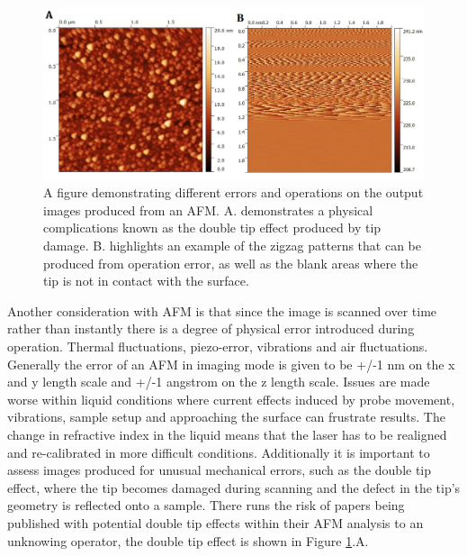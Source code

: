 \begin{figure}[h!]     %
        \begin{center}
          \includegraphics[width=140mm]{chapter2/Error.png}
\end{center}
\caption{A figure demonstrating different errors and operations on the output images produced from an AFM.  A.  demonstrates  a  physical  complications  known  as  the double tip effect produced by tip damage.  B. highlights an example of the zigzag patterns that can be produced from operation error, as well as the blank areas where the tip is not in contact with the surface.  }
\label{fig:Errorr}                 %
\end{figure}

Another consideration with AFM is that since the image is scanned over time rather than instantly there is a degree of physical error introduced during operation. Thermal fluctuations, piezo-error, vibrations and air fluctuations. Generally the error of an AFM in imaging mode is given to be +/-1 nm on the x and y length scale and +/-1 angstrom on the z length scale. Issues are made worse within liquid conditions where current effects induced by probe movement, vibrations, sample setup and approaching the surface can frustrate results. The change in refractive index in the liquid means that the laser has to be realigned and re-calibrated in more difficult conditions. Additionally it is important to assess images produced for unusual mechanical errors, such as the double tip effect, where the tip becomes damaged during scanning and the defect in the tip's geometry is reflected onto a sample. There runs the risk of papers being published with potential double tip effects within their AFM analysis to an unknowing operator, the double tip effect is shown in Figure \ref{fig:Errorr}.A.

